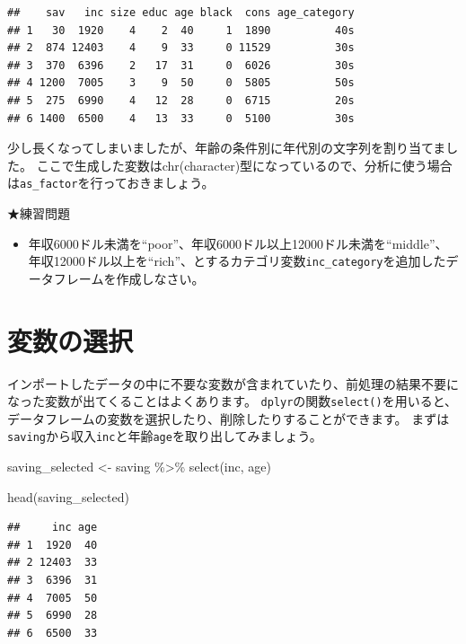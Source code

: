 \documentclass[
]{book}
\newenvironment{Shaded}{\begin{snugshade}}{\end{snugshade}}
\newcommand{\FunctionTok}[1]{\textcolor[rgb]{0.00,0.00,0.00}{#1}}
\newcommand{\NormalTok}[1]{#1}
\newcommand{\OtherTok}[1]{\textcolor[rgb]{0.56,0.35,0.01}{#1}}
\newcommand{\SpecialCharTok}[1]{\textcolor[rgb]{0.00,0.00,0.00}{#1}}
\providecommand{\tightlist}{%
  \setlength{\itemsep}{0pt}\setlength{\parskip}{0pt}}
\begin{document}
\begin{verbatim}
##    sav   inc size educ age black  cons age_category
## 1   30  1920    4    2  40     1  1890          40s
## 2  874 12403    4    9  33     0 11529          30s
## 3  370  6396    2   17  31     0  6026          30s
## 4 1200  7005    3    9  50     0  5805          50s
## 5  275  6990    4   12  28     0  6715          20s
## 6 1400  6500    4   13  33     0  5100          30s
\end{verbatim}

少し長くなってしまいましたが、年齢の条件別に年代別の文字列を割り当てました。
ここで生成した変数はchr(character)型になっているので、分析に使う場合は\texttt{as\_factor}を行っておきましょう。

★練習問題

\begin{itemize}
\tightlist
\item
  年収6000ドル未満を``poor''、年収6000ドル以上12000ドル未満を``middle''、 年収12000ドル以上を``rich''、とするカテゴリ変数\texttt{inc\_category}を追加したデータフレームを作成しなさい。
\end{itemize}

\hypertarget{ux5909ux6570ux306eux9078ux629e}{%
\section{変数の選択}\label{ux5909ux6570ux306eux9078ux629e}}

インポートしたデータの中に不要な変数が含まれていたり、前処理の結果不要になった変数が出てくることはよくあります。
\texttt{dplyr}の関数\texttt{select()}を用いると、データフレームの変数を選択したり、削除したりすることができます。
まずは\texttt{saving}から収入\texttt{inc}と年齢\texttt{age}を取り出してみましょう。

\begin{Shaded}
\begin{Highlighting}[]
\NormalTok{saving\_selected }\OtherTok{\textless{}{-}}
\NormalTok{  saving }\SpecialCharTok{\%\textgreater{}\%}
    \FunctionTok{select}\NormalTok{(inc, age)}

\FunctionTok{head}\NormalTok{(saving\_selected)}
\end{Highlighting}
\end{Shaded}

\begin{verbatim}
##     inc age
## 1  1920  40
## 2 12403  33
## 3  6396  31
## 4  7005  50
## 5  6990  28
## 6  6500  33
\end{verbatim}
\end{document}
